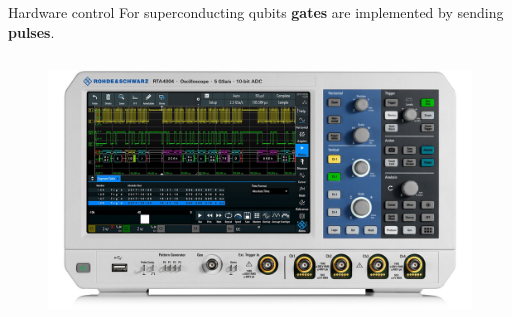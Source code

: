 \documentclass[11p,aspectratio=169]{beamer}
\begin{document}
\begin{frame}{Hardware control}
    For superconducting qubits \textbf{gates} are implemented by sending \textbf{pulses}.

    \begin{columns}
        \begin{column}{0.5 \textwidth}
            \begin{figure}
                \includegraphics[height = 0.3 \textheight]{figures/rohde.jpg}
            \end{figure}
            

\end{column}
\end{columns}
\end{frame}
\end{document}
